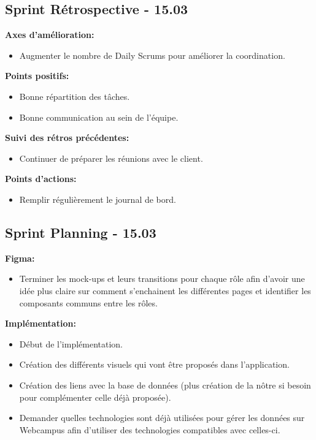 \documentclass[11pt]{article}
\begin{document}
\subsection*{{\color{navy}Sprint Rétrospective - 15.03}}
\textbf{Axes d'amélioration:}
\begin{itemize}
  \item Augmenter le nombre de Daily Scrums pour améliorer la coordination.
\end{itemize}
\textbf{Points positifs:}
\begin{itemize}
  \item Bonne répartition des tâches.
  \item Bonne communication au sein de l'équipe.
\end{itemize}
\textbf{Suivi des rétros précédentes:}
\begin{itemize}
  \item Continuer de préparer les réunions avec le client.
\end{itemize}
\textbf{Points d'actions:}
\begin{itemize}
  \item Remplir régulièrement le journal de bord.
\end{itemize}






\subsection*{{\color{navy}Sprint Planning  - 15.03}}

\textbf{Figma:}
\begin{itemize}
    \item Terminer les mock-ups et leurs transitions pour chaque rôle afin d’avoir une idée plus claire sur comment s’enchainent les différentes pages et identifier les composants communs entre les rôles.
\end{itemize}

\textbf{Implémentation:}
\begin{itemize}
    \item Début de l'implémentation.
    \item Création des différents visuels qui vont être proposés dans l’application.
    \item Création des liens avec la base de données (plus création de la nôtre si besoin pour complémenter celle déjà proposée).
    \item Demander quelles technologies sont déjà utilisées pour gérer les données sur Webcampus afin d’utiliser des technologies compatibles avec celles-ci.
\end{itemize}
\end{document}
